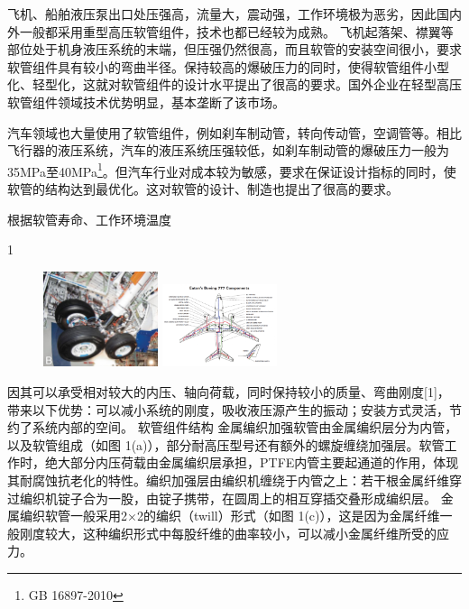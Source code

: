 飞机、船舶液压泵出口处压强高，流量大，震动强，工作环境极为恶劣，因此国内外一般都采用重型高压软管组件，技术也都已经较为成熟。
飞机起落架、襟翼等部位处于机身液压系统的末端，但压强仍然很高，而且软管的安装空间很小，要求软管组件具有较小的弯曲半径。保持较高的爆破压力的同时，使得软管组件小型化、轻型化，这就对软管组件的设计水平提出了很高的要求。国外企业在轻型高压软管组件领域技术优势明显，基本垄断了该市场。

汽车领域也大量使用了软管组件，例如刹车制动管，转向传动管，空调管等。相比飞行器的液压系统，汽车的液压系统压强较低，如刹车制动管的爆破压力一般为35MPa至40MPa\footnote{GB 16897-2010}。但汽车行业对成本较为敏感，要求在保证设计指标的同时，使软管的结构达到最优化。这对软管的设计、制造也提出了很高的要求。

根据软管寿命、工作环境温度


1

\begin{figure}
	\centering
	
	\includegraphics[width=0.3\textwidth]{figure/chap1/gear}
	\hspace{1cm}
	\includegraphics[width=0.3\textwidth]{figure/chap1/Plane}
\end{figure}







因其可以承受相对较大的内压、轴向荷载，同时保持较小的质量、弯曲刚度[1]，带来以下优势：可以减小系统的刚度，吸收液压源产生的振动；安装方式灵活，节约了系统内部的空间。
软管组件结构
金属编织加强软管由金属编织层分为内管，以及软管组成（如图 1(a)），部分耐高压型号还有额外的螺旋缠绕加强层。软管工作时，绝大部分内压荷载由金属编织层承担，PTFE内管主要起通道的作用，体现其耐腐蚀抗老化的特性。编织加强层由编织机缠绕于内管之上：若干根金属纤维穿过编织机锭子合为一股，由锭子携带，在圆周上的相互穿插交叠形成编织层。
金属编织软管一般采用2×2的编织（twill）形式（如图 1(c)），这是因为金属纤维一般刚度较大，这种编织形式中每股纤维的曲率较小，可以减小金属纤维所受的应力。

